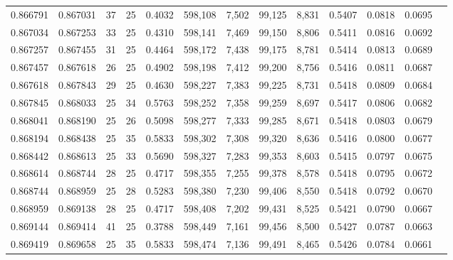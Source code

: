\begin{tabular}{rrrrrrrrrrrrr}
0.866791 & 0.867031 &    37 &  25 &                                     0.4032 & 598,108 &   7,502 &  99,125 &   8,831 & 0.5407 & 0.0818 & 0.0695 \\
0.867034 & 0.867253 &    33 &  25 &                                     0.4310 & 598,141 &   7,469 &  99,150 &   8,806 & 0.5411 & 0.0816 & 0.0692 \\
0.867257 & 0.867455 &    31 &  25 &                                     0.4464 & 598,172 &   7,438 &  99,175 &   8,781 & 0.5414 & 0.0813 & 0.0689 \\
0.867457 & 0.867618 &    26 &  25 &                                     0.4902 & 598,198 &   7,412 &  99,200 &   8,756 & 0.5416 & 0.0811 & 0.0687 \\
0.867618 & 0.867843 &    29 &  25 &                                     0.4630 & 598,227 &   7,383 &  99,225 &   8,731 & 0.5418 & 0.0809 & 0.0684 \\
0.867845 & 0.868033 &    25 &  34 &                                     0.5763 & 598,252 &   7,358 &  99,259 &   8,697 & 0.5417 & 0.0806 & 0.0682 \\
0.868041 & 0.868190 &    25 &  26 &                                     0.5098 & 598,277 &   7,333 &  99,285 &   8,671 & 0.5418 & 0.0803 & 0.0679 \\
0.868194 & 0.868438 &    25 &  35 &                                     0.5833 & 598,302 &   7,308 &  99,320 &   8,636 & 0.5416 & 0.0800 & 0.0677 \\
0.868442 & 0.868613 &    25 &  33 &                                     0.5690 & 598,327 &   7,283 &  99,353 &   8,603 & 0.5415 & 0.0797 & 0.0675 \\
0.868614 & 0.868744 &    28 &  25 &                                     0.4717 & 598,355 &   7,255 &  99,378 &   8,578 & 0.5418 & 0.0795 & 0.0672 \\
0.868744 & 0.868959 &    25 &  28 &                                     0.5283 & 598,380 &   7,230 &  99,406 &   8,550 & 0.5418 & 0.0792 & 0.0670 \\
0.868959 & 0.869138 &    28 &  25 &                                     0.4717 & 598,408 &   7,202 &  99,431 &   8,525 & 0.5421 & 0.0790 & 0.0667 \\
0.869144 & 0.869414 &    41 &  25 &                                     0.3788 & 598,449 &   7,161 &  99,456 &   8,500 & 0.5427 & 0.0787 & 0.0663 \\
0.869419 & 0.869658 &    25 &  35 &                                     0.5833 & 598,474 &   7,136 &  99,491 &   8,465 & 0.5426 & 0.0784 & 0.0661 \\

\end{tabular}
